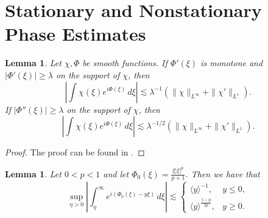\documentclass[11pt]{amsart}
\newtheorem{lemma}[theorem]{Lemma}
\theoremstyle{definition}
\theoremstyle{remark}
\numberwithin{equation}{section}
\newcommand{\ang}[1]{\langle #1 \rangle}
\begin{document}
\section{Stationary and Nonstationary Phase Estimates}

\begin{lemma}\label{lem:van_der_Corput}
    Let $\chi, \Phi$ be smooth functions. If $\Phi'(\xi)$ is monotone and $|\Phi'(\xi)| \geq \lambda$ on the support of $\chi$, then
    \[\left|\int \chi(\xi)e^{i\Phi(\xi)}\,d\xi\right| \lesssim \lambda^{-1}(\|\chi\|_{L^\infty} + \|\chi'\|_{L^1}).\]
    If $|\Phi''(\xi)| \geq \lambda$ on the support of $\chi$, then
    \[\left|\int \chi(\xi)e^{i\Phi(\xi)}\,d\xi\right| \lesssim \lambda^{-1/2}(\|\chi\|_{L^\infty} + \|\chi'\|_{L^1}).\] 
\end{lemma}

\begin{proof}
    The proof can be found in \cite[Chapter~VIII]{Stein:harmonic-analysis}.
\end{proof}

\begin{lemma}\label{lem:appendix_stationary}
    Let $0 < p < 1$ and let $\Phi_0(\xi) = \frac{\xi|\xi|^{p}}{p+1}$. Then we have that
    \[\sup_{\eta > 0}\left|\int_{\eta}^{\infty}e^{i(\Phi_0(\xi) - y\xi)}\,d\xi\right| \lesssim \begin{cases}
        \ang{y}^{-1}, & y \leq 0, \\
        \ang{y}^{\frac{1 - p}{2p}}, & y \geq 0.
    \end{cases}\]
\end{lemma}
\end{document}

